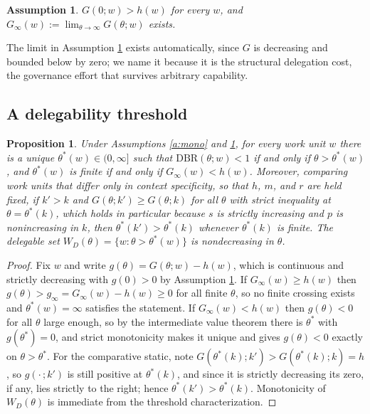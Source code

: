 \documentclass[10pt]{article}
\newtheorem{proposition}{Proposition}
\newtheorem{assumption}{Assumption}
\theoremstyle{remark}
\begin{document}
\begin{assumption}\label{a:ends}
$G(0;w)>h(w)$ for every $w$, and $G_\infty(w):=\lim_{\theta\to\infty}G(\theta;w)$ exists.
\end{assumption}

The limit in Assumption \ref{a:ends} exists automatically, since $G$ is decreasing and bounded below by zero; we name it because it is the structural delegation cost, the governance effort that survives arbitrary capability.

\subsection{A delegability threshold}

\begin{proposition}\label{p:threshold}
Under Assumptions \ref{a:mono} and \ref{a:ends}, for every work unit $w$ there is a unique $\theta^{*}(w)\in(0,\infty]$ such that $\mathrm{DBR}(\theta;w)<1$ if and only if $\theta>\theta^{*}(w)$, and $\theta^{*}(w)$ is finite if and only if $G_\infty(w)<h(w)$. Moreover, comparing work units that differ only in context specificity, so that $h$, $m$, and $r$ are held fixed, if $k'>k$ and $G(\theta;k')\ge G(\theta;k)$ for all $\theta$ with strict inequality at $\theta=\theta^{*}(k)$, which holds in particular because $s$ is strictly increasing and $p$ is nonincreasing in $k$, then $\theta^{*}(k')>\theta^{*}(k)$ whenever $\theta^{*}(k)$ is finite. The delegable set $W_D(\theta)=\{w:\theta>\theta^{*}(w)\}$ is nondecreasing in $\theta$.
\end{proposition}

\begin{proof}
Fix $w$ and write $g(\theta)=G(\theta;w)-h(w)$, which is continuous and strictly decreasing with $g(0)>0$ by Assumption \ref{a:ends}. If $G_\infty(w)\ge h(w)$ then $g(\theta)>g_\infty=G_\infty(w)-h(w)\ge0$ for all finite $\theta$, so no finite crossing exists and $\theta^{*}(w)=\infty$ satisfies the statement. If $G_\infty(w)<h(w)$ then $g(\theta)<0$ for all $\theta$ large enough, so by the intermediate value theorem there is $\theta^{*}$ with $g(\theta^{*})=0$, and strict monotonicity makes it unique and gives $g(\theta)<0$ exactly on $\theta>\theta^{*}$. For the comparative static, note $G(\theta^{*}(k);k')>G(\theta^{*}(k);k)=h$, so $g(\cdot\,;k')$ is still positive at $\theta^{*}(k)$, and since it is strictly decreasing its zero, if any, lies strictly to the right; hence $\theta^{*}(k')>\theta^{*}(k)$. Monotonicity of $W_D(\theta)$ is immediate from the threshold characterization.
\end{proof}
\end{document}
